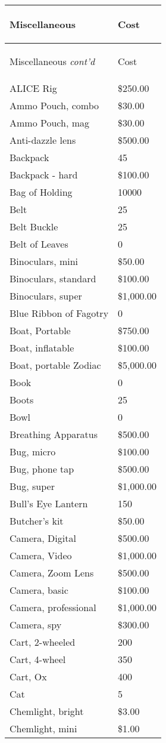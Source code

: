 \documentclass[twoside]{book}
\begin{document}
\begin{longtable}{p{1.25in}l} 
  Miscellaneous& \begin{turn}{70}{Cost}\end{turn}
          \\
  \hline
  \hline
  \endfirsthead
  Miscellaneous \textit{cont'd}
        & \begin{turn}{70}{Cost}\end{turn}
           \\
  \hline
  \endhead
\raggedright ALICE Rig&\$250.00\tabularnewline
      \raggedright Ammo Pouch, combo&\$30.00\tabularnewline
      \raggedright Ammo Pouch, mag&\$30.00\tabularnewline
      \raggedright Anti-dazzle lens&\$500.00\tabularnewline
      \raggedright Backpack&45\tabularnewline
      \raggedright Backpack - hard&\$100.00\tabularnewline
      \raggedright Bag of Holding&10000\tabularnewline
      \raggedright Belt&25\tabularnewline
      \raggedright Belt Buckle&25\tabularnewline
      \raggedright Belt of Leaves&0\tabularnewline
      \raggedright Binoculars, mini&\$50.00\tabularnewline
      \raggedright Binoculars, standard&\$100.00\tabularnewline
      \raggedright Binoculars, super&\$1,000.00\tabularnewline
      \raggedright Blue Ribbon of Fagotry&0\tabularnewline
      \raggedright Boat, Portable&\$750.00\tabularnewline
      \raggedright Boat, inflatable&\$100.00\tabularnewline
      \raggedright Boat, portable Zodiac&\$5,000.00\tabularnewline
      \raggedright Book&0\tabularnewline
      \raggedright Boots&25\tabularnewline
      \raggedright Bowl&0\tabularnewline
      \raggedright Breathing Apparatus&\$500.00\tabularnewline
      \raggedright Bug, micro&\$100.00\tabularnewline
      \raggedright Bug, phone tap&\$500.00\tabularnewline
      \raggedright Bug, super&\$1,000.00\tabularnewline
      \raggedright Bull's Eye Lantern&150\tabularnewline
      \raggedright Butcher's kit&\$50.00\tabularnewline
      \raggedright Camera, Digital&\$500.00\tabularnewline
      \raggedright Camera, Video&\$1,000.00\tabularnewline
      \raggedright Camera, Zoom Lens&\$500.00\tabularnewline
      \raggedright Camera, basic&\$100.00\tabularnewline
      \raggedright Camera, professional&\$1,000.00\tabularnewline
      \raggedright Camera, spy&\$300.00\tabularnewline
      \raggedright Cart, 2-wheeled&200\tabularnewline
      \raggedright Cart, 4-wheel&350\tabularnewline
      \raggedright Cart, Ox&400\tabularnewline
      \raggedright Cat&5\tabularnewline
      \raggedright Chemlight, bright&\$3.00\tabularnewline
      \raggedright Chemlight, mini&\$1.00\tabularnewline

\end{longtable}
\end{document}
